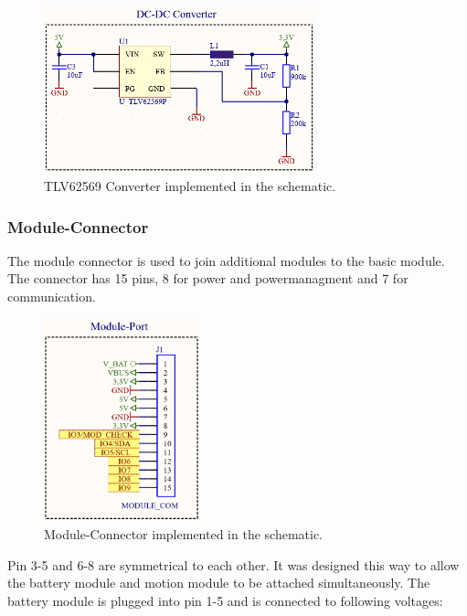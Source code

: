     \begin{figure}[H]
        \centering
        \includegraphics[width=0.7\textwidth]{assets/HW/DC-DC-schematic.png}
        \caption{TLV62569 Converter implemented in the schematic.}
    \end{figure}

    \subsubsection{Module-Connector}

    The module connector is used to join additional modules to the basic module.
    The connector has 15 pins, 8 for power and powermanagment and 7 for 
    communication. 

    \begin{figure}[H]
        \centering
        \includegraphics[width=0.4\textwidth]{assets/HW/Module-Connector-schematic.png}
        \caption{Module-Connector implemented in the schematic.}
    \end{figure}

    Pin 3-5 and 6-8 are symmetrical to each other. It was designed this way
    to allow the battery module and motion module to be attached simultaneously.
    The battery module is plugged into pin 1-5 and is connected to following 
    voltages:
    
